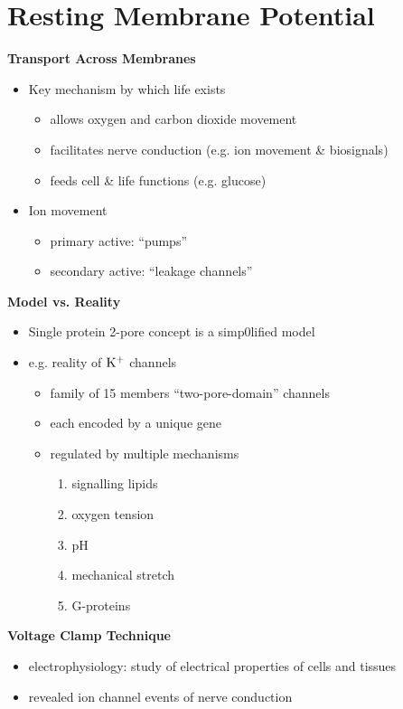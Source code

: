 \documentclass[11pt,fleqn]{book} %
\begin{document}
\section{Resting Membrane Potential}
\textbf{Transport Across Membranes}
\begin{itemize}
    \item Key mechanism by which life exists
    \begin{itemize}
        \item allows oxygen and carbon dioxide movement
        \item facilitates nerve conduction (e.g. ion movement \& biosignals)
        \item feeds cell \& life functions (e.g. glucose)
    \end{itemize}
    \item Ion movement
    \begin{itemize}
        \item primary active: \enquote{pumps}
        \item secondary active: \enquote{leakage channels}
    \end{itemize}
\end{itemize}
\textbf{Model vs. Reality}
\begin{itemize}
    \item Single protein 2-pore concept is a simp0lified model
    \item e.g. reality of ${\rm K^+}$ channels
    \begin{itemize}
        \item family of 15 members \enquote{two-pore-domain} channels
        \item each encoded by a unique gene
        \item regulated by multiple mechanisms
        \begin{enumerate}
            \item signalling lipids
            \item oxygen tension
            \item pH
            \item mechanical stretch
            \item G-proteins
        \end{enumerate}
    \end{itemize}
\end{itemize}
\textbf{Voltage Clamp Technique}
\begin{itemize}
    \item electrophysiology: study of electrical properties of cells and tissues
    \item revealed ion channel events of nerve conduction
\end{itemize}
\end{document}
